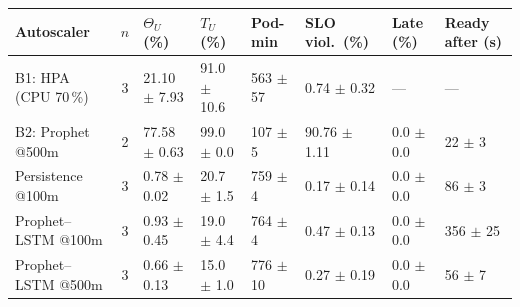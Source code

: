 \begin{tabular}{@{}lcllllll@{}}\toprule
Autoscaler & $n$ & $\Theta_U$ (\%) & $T_U$ (\%) & Pod-min & SLO viol.\ (\%) & Late (\%) & Ready after (s) \\ \midrule
B1: HPA (CPU 70\,\%) & 3 & 21.10 $\pm$ 7.93 & 91.0 $\pm$ 10.6 & 563 $\pm$ 57 & 0.74 $\pm$ 0.32 & --- & --- \\
B2: Prophet @500m & 2 & 77.58 $\pm$ 0.63 & 99.0 $\pm$ 0.0 & 107 $\pm$ 5 & 90.76 $\pm$ 1.11 & 0.0 $\pm$ 0.0 & 22 $\pm$ 3 \\
Persistence @100m & 3 & 0.78 $\pm$ 0.02 & 20.7 $\pm$ 1.5 & 759 $\pm$ 4 & 0.17 $\pm$ 0.14 & 0.0 $\pm$ 0.0 & 86 $\pm$ 3 \\
Prophet--LSTM @100m & 3 & 0.93 $\pm$ 0.45 & 19.0 $\pm$ 4.4 & 764 $\pm$ 4 & 0.47 $\pm$ 0.13 & 0.0 $\pm$ 0.0 & 356 $\pm$ 25 \\
Prophet--LSTM @500m & 3 & 0.66 $\pm$ 0.13 & 15.0 $\pm$ 1.0 & 776 $\pm$ 10 & 0.27 $\pm$ 0.19 & 0.0 $\pm$ 0.0 & 56 $\pm$ 7 \\
\bottomrule\end{tabular}
